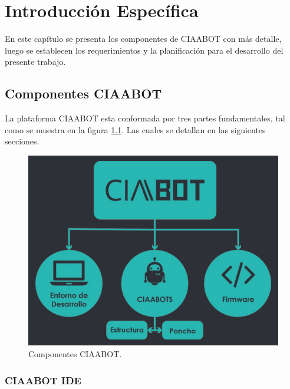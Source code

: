 \chapter{Introducción Específica} %

\label{Chapter2}

En este capítulo se presenta los componentes de CIAABOT con más detalle, luego se establecen los requerimientos y
la planificación para el desarrollo del presente trabajo.

\section{Componentes CIAABOT}
\label{sec:Componentes CIAABOT}
La plataforma CIAABOT esta conformada por tres partes fundamentales, tal como se muestra en la figura \ref{fig:componentesCiaabot}. Las cuales se detallan en las siguientes secciones.

\begin{figure}[h]
	\centering
	\includegraphics[scale=.50]{./Figures/componentesCiabot.png}
	\caption{Componentes CIAABOT.}
	\label{fig:componentesCiaabot}
\end{figure}

\subsection{CIAABOT IDE}

